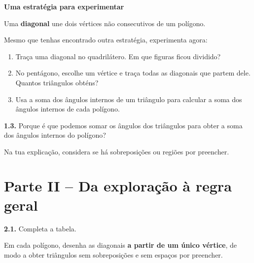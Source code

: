 
\begin{tcolorbox}[
colback=azulClaro,
colframe=azulPDMI!45,
boxrule=.5pt,
arc=2mm,
left=7pt,
right=7pt,
top=5pt,
bottom=5pt
]

\textbf{Uma estratégia para experimentar}

Uma \textbf{diagonal} une dois vértices
não consecutivos de um polígono.

Mesmo que tenhas encontrado outra
estratégia, experimenta agora:

\begin{enumerate}[
label=\alph*),
leftmargin=1.7em,
nosep,
topsep=2pt
]

\item
Traça uma diagonal no quadrilátero.
Em que figuras ficou dividido?

\item
No pentágono, escolhe um vértice
e traça todas as diagonais que
partem dele.
Quantos triângulos obténs?

\item
Usa a soma dos ângulos internos
de um triângulo para calcular a
soma dos ângulos internos de
cada polígono.

\end{enumerate}

\end{tcolorbox}

\textbf{1.3.}
Porque é que podemos somar os ângulos
dos triângulos para obter a soma dos
ângulos internos do polígono?

Na tua explicação, considera se há
sobreposições ou regiões por preencher.



\section*{Parte II -- Da exploração à regra geral}

\textbf{2.1.}
Completa a tabela.

Em cada polígono, desenha as diagonais
\textbf{a partir de um único vértice},
de modo a obter triângulos sem
sobreposições e sem espaços por preencher.

